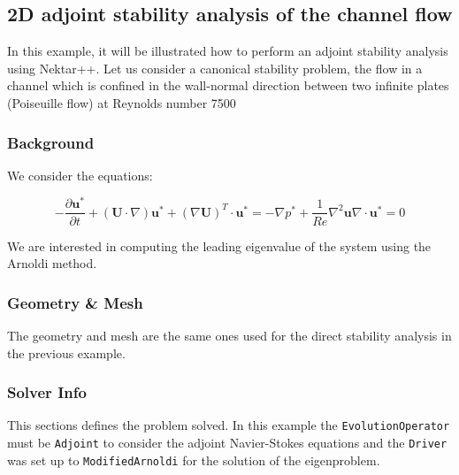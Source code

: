  \subsection{2D adjoint stability analysis of the channel flow}

 In this example, it will be illustrated how to perform an adjoint stability analysis using Nektar++. Let us consider a canonical stability problem, the flow in a channel which is confined in the wall-normal direction between two infinite plates (Poiseuille flow) at Reynolds number 7500

 \subsubsection{Background}

  We consider the equations:

  \begin{subequations}
  \begin{equation}
  -\frac{\partial \mathbf{u}^*}{\partial t}+(\mathbf{U} \cdot \nabla)\mathbf{u}^*+(\nabla \mathbf{U})^T \cdot \mathbf{u}^*=-\nabla p^*+\frac{1}{Re} \nabla^2 \mathbf{u}
  \end{equation}

  \begin{equation}
  \nabla \cdot \mathbf{u}^*=0
  \end{equation}
  \end{subequations}

  We are interested in computing the leading eigenvalue of the system using the Arnoldi method.

 \subsubsection{Geometry \& Mesh}

 The geometry and mesh are the same ones used for the direct stability analysis in the previous example.

 \subsubsection{Solver Info}

 This sections defines the problem solved. In this example the \texttt{EvolutionOperator} must be \texttt{Adjoint} to consider the adjoint Navier-Stokes equations and the \texttt{Driver} was set up to \texttt{ModifiedArnoldi} for the solution of the eigenproblem.

